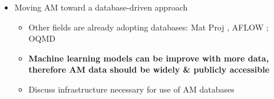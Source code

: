 \documentclass[notitlepage,nofootinbib]{revtex4-1}
\begin{document}
\begin{itemize}
	\item Moving AM toward a database-driven approach \begin{itemize}
		\item Other fields are already adopting databases: Mat Proj \cite{Jain2013}, AFLOW \cite{Curtarolo2012}; OQMD
		\item \textbf{Machine learning models can be improve with more data, therefore AM data should be widely \& publicly accessible}
		\item Discuss infrastructure necessary for use of AM databases
		\end{itemize}


\end{itemize}




\end{document}
